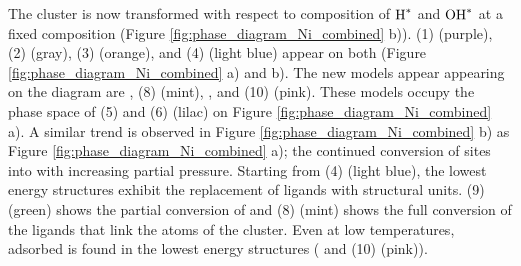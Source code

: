 \documentclass[journal=jctcce,manuscript=article]{achemso}
\begin{document}
The cluster is now transformed with respect to composition of $\ce{H^{*}}$ and $\ce{OH^{*}}$ at a fixed  composition (Figure \ref{fig:phase_diagram_Ni_combined} b)). (1)  (purple), (2)  (gray), (3)  (orange), and (4)  (light blue) appear on both (Figure \ref{fig:phase_diagram_Ni_combined} a) and b). The new models appear appearing on the diagram are , (8)  (mint), , and (10)  (pink). These models occupy the phase space of (5)  and (6)  (lilac) on Figure \ref{fig:phase_diagram_Ni_combined} a). A similar trend is observed in Figure \ref{fig:phase_diagram_Ni_combined} b) as Figure \ref{fig:phase_diagram_Ni_combined} a); the continued conversion of  sites into  with increasing  partial pressure. Starting from (4)  (light blue), the lowest energy structures exhibit the replacement of  ligands with  structural units. (9)   (green) shows the partial conversion of and (8)  (mint) shows the full conversion of the  ligands that link the  atoms of the cluster. Even at low temperatures, adsorbed  is found in the lowest energy structures ( and (10)  (pink)). 
\end{document}
